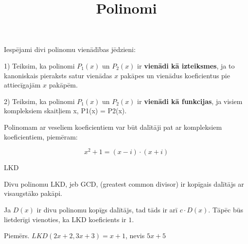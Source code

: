 \documentclass[12pt]{article}
\title{Polinomi}
\author{}
\date{}
\begin{document}
\maketitle


Iespējami divi polinomu vienādības jēdzieni:

1) Teiksim, ka polinomi $P_1(x)$ un $P_2(x)$ ir \textbf{vienādi kā izteiksmes}, ja to kanoniskais pieraksts satur vienādas $x$ pakāpes un vienādus koeficientus pie attiecīgajām $x$ pakāpēm.

2) Teiksim, ka polinomi $P_1(x)$ un $P_2(x)$ ir \textbf{vienādi kā funkcijas}, ja visiem kompleksiem skaitļiem x, P1(x) = P2(x).

Polinomam ar veseliem koeficientiem var būt dalītāji pat ar kompleksiem koeficientiem, piemēram:

$$
x^2 + 1 = (x - i) \cdot (x + i)
$$

LKD

Divu polinomu LKD, jeb GCD, (greatest common divisor) ir kopīgais dalītājs ar visaugstāko pakāpi.

Ja $D(x)$ ir divu polinomu kopīgs dalītājs, tad tāds ir arī $c \cdot D(x)$. Tāpēc būs lietderīgi vienoties, ka LKD koeficients ir $1$.

Piemērs. $LKD(2x+2, 3x+3) = x+1$, nevis $5x+5$


\pagebreak


\begin{gather}
\end{gather}
\end{document}
